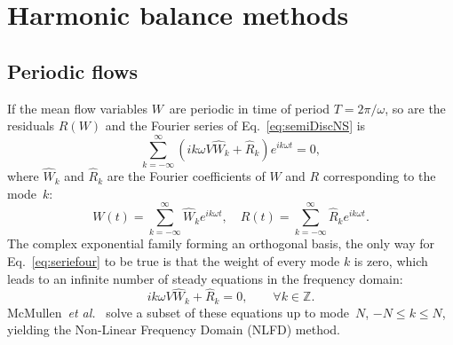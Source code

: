 \chapter{Harmonic balance methods} %
\label{cha:harmonic_balance_methods}

\section{Periodic flows} %
\label{sec:periodic_flows}

If the mean flow variables $W$~are periodic in time of period $T =
2\pi/\omega$, so are the residuals $R(W)$ and the Fourier series of
Eq.~\eqref{eq:semiDiscNS} is
\begin{equation}
  \label{eq:seriefour}
  \sum_{k=-\infty}^\infty \left(ik\omega
    V\widehat{W}_k+\widehat{R}_k\right)e^{ik\omega t}=0,
\end{equation}
where $\widehat{W}_k$ and $\widehat{R}_k$ are the Fourier coefficients
of $W$ and $R$ corresponding to the mode~$k$:
\begin{equation}
   W(t) = \sum_{k=-\infty}^{\infty} \widehat{W}_k e^{i k\omega t},\quad
   R(t) = \sum_{k=-\infty}^{\infty} \widehat{R}_k e^{i k\omega t}.
   \label{eq:fourierWsf}
\end{equation}
The complex exponential family forming an orthogonal basis, the only
way for Eq.~\eqref{eq:seriefour} to be true is that the weight of
every mode $k$ is zero, which leads to an infinite number of steady
equations in the frequency domain:
\begin{equation}
  \label{eq:orthodelim}
  ik\omega V\widehat{W}_k+\widehat{R}_k=0, \quad \quad \forall k \in
  \mathbb{Z}.
\end{equation}
McMullen~\emph{et al.}~\cite{McMullen2001,McMullen2002,McMullen2006}
solve a subset of these equations up to mode~$N$, $-N\leq k\leq N$,
yielding the Non-Linear Frequency Domain (NLFD) method.

